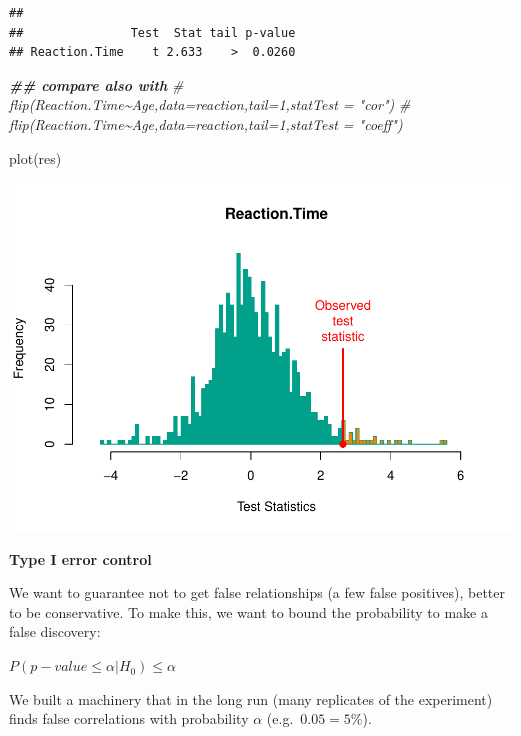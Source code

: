\documentclass[
]{article}
\newenvironment{Shaded}{\begin{snugshade}}{\end{snugshade}}
\newcommand{\CommentTok}[1]{\textcolor[rgb]{0.56,0.35,0.01}{\textit{#1}}}
\newcommand{\DocumentationTok}[1]{\textcolor[rgb]{0.56,0.35,0.01}{\textbf{\textit{#1}}}}
\newcommand{\FunctionTok}[1]{\textcolor[rgb]{0.00,0.00,0.00}{#1}}
\newcommand{\NormalTok}[1]{#1}
\begin{document}
\begin{verbatim}
## 
##               Test  Stat tail p-value
## Reaction.Time    t 2.633    >  0.0260
\end{verbatim}

\begin{Shaded}
\begin{Highlighting}[]
\DocumentationTok{\#\# compare also with}
\CommentTok{\# flip(Reaction.Time\textasciitilde{}Age,data=reaction,tail=1,statTest = "cor")}
\CommentTok{\# flip(Reaction.Time\textasciitilde{}Age,data=reaction,tail=1,statTest = "coeff")}
\end{Highlighting}
\end{Shaded}

\begin{Shaded}
\begin{Highlighting}[]
\FunctionTok{plot}\NormalTok{(res)}
\end{Highlighting}
\end{Shaded}

\begin{center}\includegraphics{perm_files/figure-latex/unnamed-chunk-14-1} \end{center}

\textbf{Type I error control}

We want to guarantee not to get false relationships (a few false
positives), better to be conservative. To make this, we want to bound
the probability to make a false discovery:

\(P (p-value \leq \alpha | H_0) \leq \alpha\)

We built a machinery that in the long run (many replicates of the
experiment) finds false correlations with probability \(\alpha\)
(e.g.~\(0.05=5\%\)).
\end{document}
